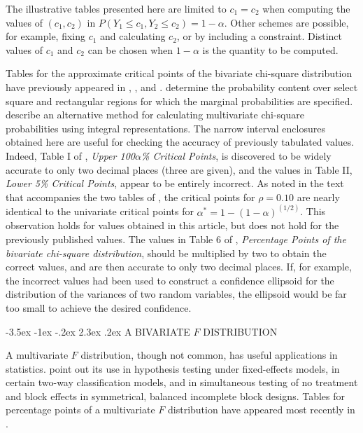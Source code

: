 \documentclass[10pt,letterpaper]{article}
\makeatletter
\renewcommand\section{\@startsection {section}{1}{\z@}%
                 {-3.5ex \@plus -1ex \@minus -.2ex}%
                 {2.3ex \@plus.2ex}%
                 {\normalfont\normalsize\bfseries }}
\makeatother
\begin{document}
The illustrative tables presented here are limited to $c_1 = c_2$ when
computing the values of $(c_1, c_2)$ in $P(Y_1 \leq c_1, Y_2 \leq c_2) =
1-\alpha$.  Other schemes are possible, for example, fixing $c_1$ and 
calculating $c_2$, or by including a 
constraint.  Distinct values of $c_1$ and $c_2$ can be chosen when
$1-\alpha$ is the quantity to be computed.

Tables for the approximate 
critical points of the bivariate chi-square distribution 
have previously appeared in \cite{GunstNote}, \cite{Gunst}, 
and \cite{Krishnaiah80}.
\cite{Jensen} determine the probability content over select square and
rectangular regions for which the marginal probabilities are specified.
\cite{Dutt76} describe an alternative method for calculating multivariate
chi-square probabilities using integral representations.
The narrow interval enclosures obtained here are 
useful for checking the accuracy of
previously tabulated values.   Indeed, Table I  of \cite{GunstNote},
{\it Upper 100$\alpha$\% Critical Points},
is discovered to be widely accurate to only two decimal places (three
are given), and the values in Table II, {\it Lower 5\% Critical Points},
appear to be entirely incorrect.  As 
noted in the text that accompanies the two tables of \cite{GunstNote},
the critical points for $\rho = 0.10$ are
nearly identical to the univariate critical points for 
$\alpha^* = 1 - (1-\alpha)^{(1/2)}$.  This observation holds for values
obtained in this article, but does not hold for the previously 
published values.
The values in Table 6 of \cite{Krishnaiah80}, {\it Percentage
Points of the bivariate chi-square distribution}, should be multiplied by
two to obtain the correct values, and are then accurate to only two decimal
places.  If, for example, the incorrect values had been used to construct a
confidence ellipsoid for the distribution of the variances of two random
variables, the ellipsoid would be far too small to achieve the desired
confidence. 
    

\section{A BIVARIATE $F$ DISTRIBUTION\label{sec:bivf}}

A multivariate $F$ distribution, though not common, has useful applications in
statistics. \cite{Krishnaiah75} point out its use in hypothesis testing under
fixed-effects models, in certain two-way classification models, and in
simultaneous testing of no treatment and block effects in symmetrical, 
balanced incomplete block designs.  
Tables for percentage points of a multivariate $F$
distribution have appeared most recently in \cite{Krishnaiah80}.  
\end{document}
